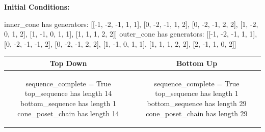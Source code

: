 \documentclass[10pt]{article}
\begin{document}
\textbf{Initial Conditions:}
\begin{SAGE}
inner_cone has generators: 
[[-1, -2, -1, 1, 1], [0, -2, -1, 1, 2], [0, -2, -1, 2, 2], [1, -2, 0, 1, 2], [1, -1, 0, 1, 1], [1, 1, 1, 2, 2]]
outer_cone has generators: 
[[-1, -2, -1, 1, 1], [0, -2, -1, -1, 2], [0, -2, -1, 2, 2], [1, -1, 0, 1, 1], [1, 1, 1, 2, 2], [2, -1, 1, 0, 2]]

\end{SAGE}
\begin{tabular}{c|c}
\textbf{Top Down} & \textbf{Bottom Up} \\ \hline  
\begin{SAGE}
sequence_complete = True
top_sequence has length 14
bottom_sequence has length 1
cone_poset_chain has length 14
\end{SAGE} 
&
\begin{SAGE}
sequence_complete = True
top_sequence has length 1
bottom_sequence has length 29
cone_poset_chain has length 29
\end{SAGE} 
\\ \hline


\end{tabular}
\end{document}
